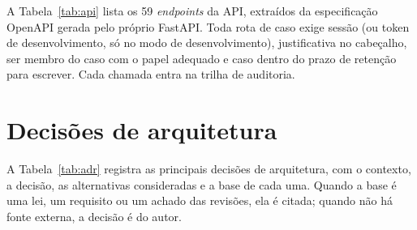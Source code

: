 A Tabela~\ref{tab:api} lista os 59 \textit{endpoints} da API, extraídos da
especificação OpenAPI gerada pelo próprio FastAPI. Toda rota de caso exige
sessão (ou token de desenvolvimento, só no modo de desenvolvimento),
justificativa no cabeçalho, ser membro do caso com o papel adequado e caso
dentro do prazo de retenção para escrever. Cada chamada entra na trilha de
auditoria.



\section{Decisões de arquitetura}
\label{sec:desenv-decisoes}

A Tabela~\ref{tab:adr} registra as principais decisões de arquitetura, com o
contexto, a decisão, as alternativas consideradas e a base de cada uma.
Quando a base é uma lei, um requisito ou um achado das revisões, ela é citada;
quando não há fonte externa, a decisão é do autor.

